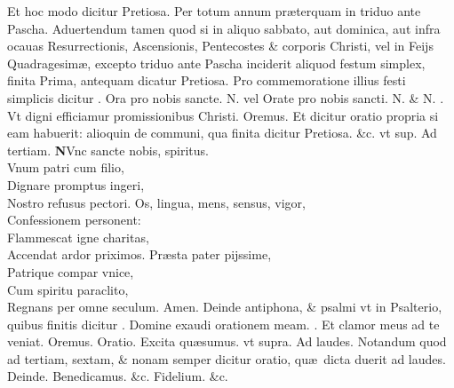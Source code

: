 \documentclass[a5paper,10pt]{book}
\def\ae{æ}
\begin{document}
\begin{multicols*}{2}
\color{red} Et hoc modo dicitur \color{black} Pretiosa. \color{red} Per totum annum pr\ae terquam in triduo ante Pascha. \color{black}
\newline {} \color{red} Aduertendum tamen quod si in aliquo sabbato, aut dominica, aut infra ocauas Resurrectionis, Ascensionis, Pentecostes \& corporis Christi, vel in Feijs Quadragesim\ae , excepto triduo ante Pascha inciderit aliquod festum simplex, finita Prima, antequam dicatur \color{black} Pretiosa. \color{red} Pro commemoratione illius festi simplicis dicitur \Vbar . \color{black} Ora pro nobis sancte. \color{red} N. vel \color{black} Orate pro nobis sancti. \color{red} N. \& N. \Rbar . \color{black} Vt digni efficiamur promissionibus Christi. \color{red} O\color{black}remus. \color{red} Et dicitur oratio propria si eam habuerit: alioquin de communi, qua finita dicitur \color{black} Pretiosa. \color{red} \&c. vt sup. \color{black}
\newline {} \color{red} Ad \hypertarget{DOM-PRIMA-ADV-TER}{tertiam.} \color{black}
\vspace{-.25em}
\lettrine[lines=2]{\bfseries \color{red} N}{}Vnc sancte nobis, spiritus.\\Vnum patri cum filio,\\Dignare promptus ingeri,\\Nostro refusus pectori.
\newline \color{red} O\color{black}s, lingua, mens, sensus, vigor,\\Confessionem personent:\\Flammescat igne charitas,\\Accendat ardor priximos.
\newline \color{red} P\color{black}r\ae sta pater pijssime,\\Patrique compar vnice,\\Cum spiritu paraclito,\\Regnans per omne seculum. Amen.
\newline {} \color{red} Deinde antiphona, \& psalmi vt in Psalterio, quibus finitis dicitur \Vbar . \color{black} Domine exaudi orationem meam. \color{red} \Rbar . \color{black} Et clamor meus ad te veniat. \color{red} O\color{black}remus. \color{red} Oratio. \color{black} Excita qu\ae sumus. \color{red} vt supra. \color{black}
\newline {} \color{red} Ad laudes. Notandum quod ad tertiam, sextam, \& nonam semper dicitur oratio, qu\ae \ dicta duerit ad laudes. Deinde. \color{black} Benedicamus. \color{red} \&c. \color{black} Fidelium. \color{red} \&c. \color{black}

\end{multicols*}
\end{document}
